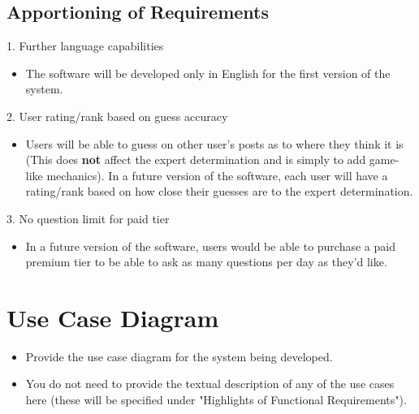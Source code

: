 \documentclass[]{article}
\begin{document}
\subsection{Apportioning of Requirements}
\label{sub:apportioning_of_requirements}
1. Further language capabilities
\begin{itemize}
	\item The software will be developed only in English for the first version
		of the system.
\end{itemize}
2. User rating/rank based on guess accuracy
\begin{itemize}
	\item Users will be able to guess on other user's posts as to where
		they think it is (This does \textbf{not} affect the expert determination
		and is simply to add game-like mechanics). In a future version of the software,
		each user will have a rating/rank
		based on how close their guesses are to the expert determination.
\end{itemize}
3. No question limit for paid tier
\begin{itemize}
	\item In a future version of the software, users would be able to
		purchase a paid premium tier to be able to ask as many questions
		per day as they'd like.
\end{itemize}

\section{Use Case Diagram}
\label{sec:use_case_diagram}
\begin{itemize}
	\item Provide the use case diagram for the system being developed.
	\item You do not need to provide the textual description of any of the use cases here (these will be specified under "Highlights of Functional Requirements").
\end{itemize}
\end{document}
